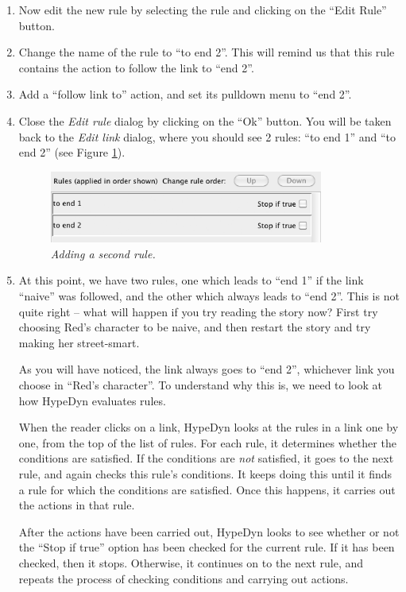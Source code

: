 \documentclass{article}
\begin{document}
\begin{enumerate}
\item Now edit the new rule by selecting the rule and clicking on the ``Edit
Rule'' button.

\item Change the name of the rule to ``to end 2''. This will remind us that
this rule contains the action to follow the link to ``end 2''.

\item Add a ``follow link to'' action, and set its pulldown menu to ``end 2''.

\item Close the \textit{Edit rule} dialog by clicking on the ``Ok'' button. You
will be taken back to the \textit{Edit link} dialog, where you should see 2
rules: ``to end 1'' and ``to end 2'' (see Figure \ref{fig:tut2:rules_with_new}).

\begin{figure}[h]
  \centering
  \includegraphics[width=9cm]{images/hypedyn-tutorial-2-figure-5}
  \caption{\textit{Adding a second rule.}}
  \label{fig:tut2:rules_with_new}
\end{figure}

\item At this point, we have two rules, one which leads to ``end 1'' if the
link ``naive'' was followed, and the other which always leads to ``end 2''.
This is not quite right -- what will happen if you try reading the story now?
First try choosing Red's character to be naive, and then restart the story and
try making her street-smart.

As you will have noticed, the link always goes to ``end 2'', whichever link you
choose in ``Red's character''. To understand why this is, we need to look at
how HypeDyn evaluates rules.

When the reader clicks on a link, HypeDyn looks at the rules in a link one by
one, from the top of the list of rules. For each rule, it determines whether the
conditions are satisfied. If the conditions are \textit{not} satisfied, it goes
to the next rule, and again checks this rule's conditions. It keeps doing this
until it finds a rule for which the conditions are satisfied. Once this happens,
it carries out the actions in that rule.

After the actions have been carried out, HypeDyn looks to see whether or not the
``Stop if true'' option has been checked for the current rule. If it has been
checked, then it stops. Otherwise, it continues on to the next rule, and
repeats the process of checking conditions and carrying out actions.


\end{enumerate}
\end{document}
